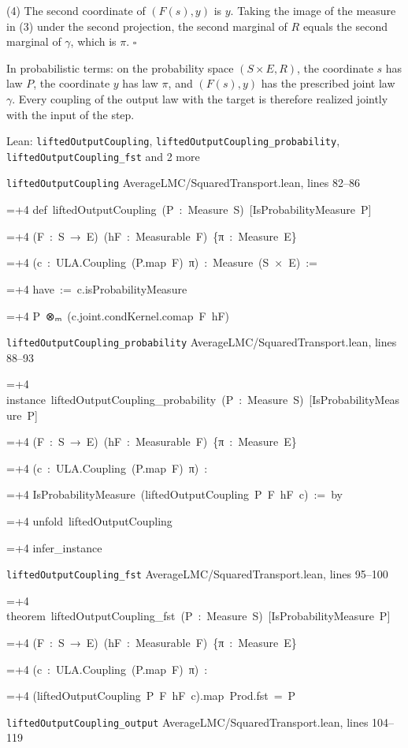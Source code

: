 \documentclass[11pt,a4paper]{article}
\newlength{\leancharwidth}
\newenvironment{leancode}{\par\smallskip\begingroup\ttfamily\footnotesize\raggedright
  \settowidth{\leancharwidth}{M}\setlength{\parskip}{0pt}\setlength{\parindent}{0pt}
  \frenchspacing}{\par\endgroup\smallskip}
\newcommand{\leanline}[2]{\hangindent=\dimexpr#1\leancharwidth+4\leancharwidth\relax
  \hangafter=1\noindent\hspace*{#1\leancharwidth}#2\par}
\newcommand{\leansource}[1]{\par{\footnotesize\color{leanmuted}#1}\par}
\begin{document}
(4) The second coordinate of \((F(s),y)\) is \(y\). Taking the image of the measure in (3) under the second projection, the second marginal of \(R\) equals the second marginal of \(\gamma\), which is \(\pi\). \(\square\)




In probabilistic terms: on the probability space \((S\times E,R)\), the coordinate \(s\) has law \(P\), the coordinate \(y\) has law \(\pi\), and \((F(s),y)\) has the prescribed joint law \(\gamma\). Every coupling of the output law with the target is therefore realized jointly with the input of the step.

\begin{leanbox}{Lean: \texttt{liftedOutputCoupling}, \texttt{liftedOutputCoupling\_\allowbreak{}probability}, \texttt{liftedOutputCoupling\_\allowbreak{}fst} and 2 more}
\leansource{\texttt{liftedOutputCoupling} \quad AverageLMC/\allowbreak{}SquaredTransport.lean, lines 82–86}
\begin{leancode}
\leanline{0}{def\ liftedOutputCoupling\ (P\ :\ Measure\ S)\ [IsProbabilityMeasure\ P]}
\leanline{4}{(F\ :\ S\ →\ E)\ (hF\ :\ Measurable\ F)\ \{π\ :\ Measure\ E\}}
\leanline{4}{(c\ :\ ULA.Coupling\ (P.map\ F)\ π)\ :\ Measure\ (S\ ×\ E)\ :=}
\leanline{2}{have\ :=\ c.isProbabilityMeasure}
\leanline{2}{P\ ⊗ₘ\ (c.joint.condKernel.comap\ F\ hF)}
\end{leancode}
\leansource{\texttt{liftedOutputCoupling\_\allowbreak{}probability} \quad AverageLMC/\allowbreak{}SquaredTransport.lean, lines 88–93}
\begin{leancode}
\leanline{0}{instance\ liftedOutputCoupling\_probability\ (P\ :\ Measure\ S)\ [IsProbabilityMeasure\ P]}
\leanline{4}{(F\ :\ S\ →\ E)\ (hF\ :\ Measurable\ F)\ \{π\ :\ Measure\ E\}}
\leanline{4}{(c\ :\ ULA.Coupling\ (P.map\ F)\ π)\ :}
\leanline{4}{IsProbabilityMeasure\ (liftedOutputCoupling\ P\ F\ hF\ c)\ :=\ by}
\leanline{2}{unfold\ liftedOutputCoupling}
\leanline{2}{infer\_instance}
\end{leancode}
\leansource{\texttt{liftedOutputCoupling\_\allowbreak{}fst} \quad AverageLMC/\allowbreak{}SquaredTransport.lean, lines 95–100}
\begin{leancode}
\leanline{0}{theorem\ liftedOutputCoupling\_fst\ (P\ :\ Measure\ S)\ [IsProbabilityMeasure\ P]}
\leanline{4}{(F\ :\ S\ →\ E)\ (hF\ :\ Measurable\ F)\ \{π\ :\ Measure\ E\}}
\leanline{4}{(c\ :\ ULA.Coupling\ (P.map\ F)\ π)\ :}
\leanline{4}{(liftedOutputCoupling\ P\ F\ hF\ c).map\ Prod.fst\ =\ P}
\end{leancode}
\leansource{\texttt{liftedOutputCoupling\_\allowbreak{}output} \quad AverageLMC/\allowbreak{}SquaredTransport.lean, lines 104–119}

\end{leanbox}
\end{document}

